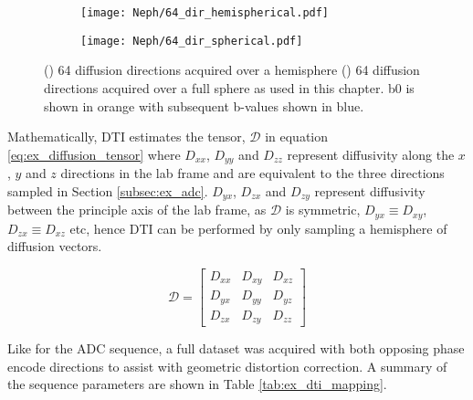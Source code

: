 \begin{figure}[H]
	\centering
	\begin{subfigure}[c]{0.47\textwidth}
		\centering
		\texttt{[image: Neph/64\_dir\_hemispherical.pdf]}
		\caption{}
		\label{fig:ex_dti_vectors_half}
	\end{subfigure}
	\hfill
	\begin{subfigure}[c]{0.47\textwidth}
		\centering
		\texttt{[image: Neph/64\_dir\_spherical.pdf]}
		\caption{}
		\label{fig:ex_dti_vectors_full}
	\end{subfigure}
	\caption{() 64 diffusion directions acquired over a hemisphere () 64 diffusion directions acquired over a full sphere as used in this chapter. b0 is shown in orange with subsequent b-values shown in blue. }
	\label{fig:ex_dti_vectors}
\end{figure}

Mathematically, \ac{DTI} estimates the tensor, $\mathscr{D}$ in equation \eqref{eq:ex_diffusion_tensor} where $D_{xx}$, $D_{yy}$ and $D_{zz}$ represent diffusivity along the $x$, $y$ and $z$ directions in the lab frame and are equivalent to the three directions sampled in Section \ref{subsec:ex_adc}. $D_{yx}$, $D_{zx}$ and $D_{zy}$ represent diffusivity between the principle axis of the lab frame, as $\mathscr{D}$ is symmetric, $D_{yx} \equiv D_{xy}$, $D_{zx} \equiv D_{xz}$ etc, hence \ac{DTI} can be performed by only sampling a hemisphere of diffusion vectors.

\begin{equation}
	\mathscr{D} = 
	\begin{bmatrix}
		D_{xx} & D_{xy} & D_{xz}\\ 
		D_{yx} & D_{yy} & D_{yz}\\ 
		D_{zx} & D_{zy} & D_{zz}
	\end{bmatrix}
\label{eq:ex_diffusion_tensor}
\end{equation}

Like for the \ac{ADC} sequence, a full dataset was acquired with both opposing phase encode directions to assist with geometric distortion correction. A summary of the sequence parameters are shown in Table \ref{tab:ex_dti_mapping}. 

